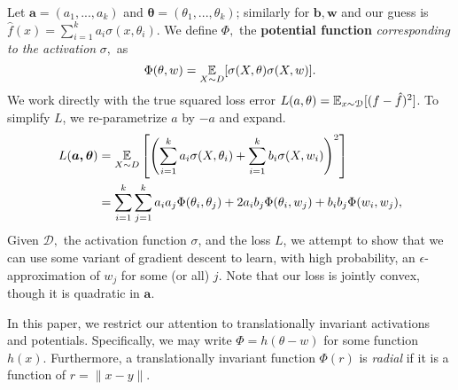 Let $\boldsymbol{a} = (a_1,...,a_k)$ and $\boldsymbol{\theta} =
(\theta_1,...,\theta_k)$; similarly for $\boldsymbol{b},
\boldsymbol{w}$ and our guess is $\hat{f}(x) = \sum_{i=1}^k a_i
\sigma(x, \theta_i)$. 
We define $\Phi,$ the {\bf potential function} {\it corresponding to the activation
  } $\sigma,$ as
\[\Phi(\theta, w) = \operatorname*{\mathbb{E}}_{X\sim D}[ \sigma(X,\theta) \sigma(X,w)].\]
%
We work directly with the true squared loss error
$L(a,\theta)= \operatorname*{\mathbb{E}}_{x \sim \mathcal{D}}[(f - \hat{f})^2]$. To
simplify $L$, we re-parametrize $a$ by $-a$ and expand.
%
%
\begin{align}
 L(\boldsymbol{a,\theta})  & = \expt_{X\sim D}\left[ \left(
  \sum_{i=1}^k a_i \sigma(X,\theta_i) + \sum_{i=1}^k
  b_i\sigma(X,w_i)\right)^2\right] \nonumber \\
%
& = \sum_{i=1}^k \sum_{j=1}^k a_i a_j \Phi(\theta_i,\theta_j)+ 2 a_ib_j \Phi(\theta_i,w_j)+ b_i b_j \Phi(w_i,w_j),
 \label{errLoss}
\end{align}
%
Given $\mathcal{D},$ the activation function $\sigma$, and the loss
$L$, we attempt to show that we can use some variant of gradient
descent to learn, with high probability, an $\epsilon$-approximation
of $w_j$ for some (or all) $j$. 
Note that our loss is jointly convex, though it is quadratic in
$\boldsymbol{a}$. 








In this paper, we restrict our attention to translationally invariant activations
and potentials.
%
Specifically, we may write $\Phi= h(\theta-w)$ for some function $h(x).$ Furthermore, a translationally invariant function $\Phi(r)$ is {\it radial} if it is a function of $r = \|x - y \|$.

